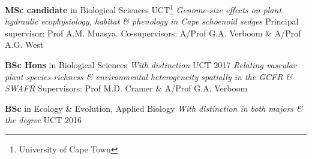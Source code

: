 \begin{hangparas}{2em}{1}

\textbf{MSc candidate} in Biological Sciences \hfill {\small UCT\footnote{University of Cape Town}} \break %
\textit{Genome-size effects on plant hydraulic ecophysiology, habitat \&
  phenology in Cape schoenoid sedges} \break
Principal supervisor: Prof A.M. Muasya. Co-supervisors: A/Prof G.A. Verboom
  \& A/Prof A.G. West

\textbf{BSc Hons} in Biological Sciences {\small \textit{With distinction}}
                                                 \hfill {\small UCT 2017} \break
\textit{Relating vascular plant species richness \& environmental heterogeneity
  spatially in the GCFR \& SWAFR} \break
Supervisors: Prof M.D. Cramer \& A/Prof G.A. Verboom

\textbf{BSc} in Ecology \& Evolution, Applied Biology {\small \textit{With
  distinction in both majors \& the degree}}            \hfill {\small UCT 2016}

\end{hangparas}
